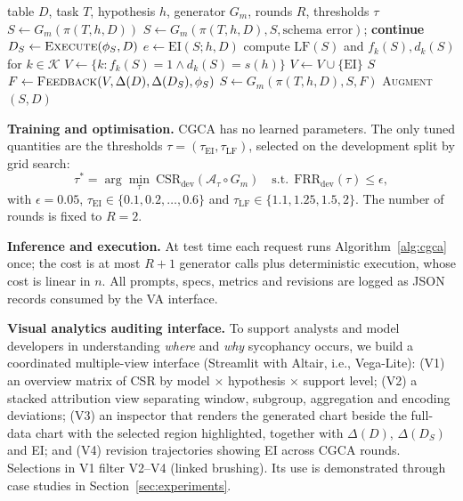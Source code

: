 \documentclass[conference]{IEEEtran}
\newcommand{\EI}{\mathrm{EI}}
\newcommand{\VSR}{\mathrm{CSR}}
\newcommand{\LF}{\mathrm{LF}}
\begin{document}
\begin{algorithm}[t]
\caption{Context-Grounded Chart Auditing (CGCA)}
\label{alg:cgca}
\begin{algorithmic}[1]
\Require table $D$, task $T$, hypothesis $h$, generator $G_m$, rounds $R$, thresholds $\tau$
\State $S \gets G_m(\pi(T,h,D))$
     \State $S \gets G_m(\pi(T,h,D), S, \text{schema error})$; \textbf{continue}
  \EndIf
  \State $D_S \gets \textsc{Execute}(\phi_S, D)$
  \State $e \gets \EI(S;h,D)$
  \State compute $\LF(S)$ and $f_k(S), d_k(S)$ for $k\in\mathcal{K}$
  \State $V \gets \{k : f_k(S)=1 \wedge d_k(S)=s(h)\}$
  \If{$e>\tau_{\EI}$} $V \gets V \cup \{\text{EI}\}$ \EndIf
   \State \Return $S$ \EndIf
    \State $F \gets \textsc{Feedback}(V, \Delta(D), \Delta(D_S), \phi_S)$
    \State $S \gets G_m(\pi(T,h,D), S, F)$
  \EndIf
\EndFor
\State \Return \textsc{Augment}$(S, D)$ 
\end{algorithmic}
\end{algorithm}

\textbf{Training and optimisation.} CGCA has no learned parameters. The only tuned quantities are the thresholds $\tau=(\tau_{\EI}, \tau_{\LF})$, selected on the development split by grid search:
\begin{equation}
\tau^\ast = \arg\min_{\tau}\ \VSR_{\text{dev}}(\mathcal{A}_\tau\circ G_m)\quad \text{s.t.}\ \ \mathrm{FRR}_{\text{dev}}(\tau)\le \epsilon,
\label{eq:calib}
\end{equation}
with $\epsilon = 0.05$, $\tau_{\EI}\in\{0.1,0.2,\dots,0.6\}$ and $\tau_{\LF}\in\{1.1,1.25,1.5,2\}$. The number of rounds is fixed to $R=2$.

\textbf{Inference and execution.} At test time each request runs Algorithm~\ref{alg:cgca} once; the cost is at most $R+1$ generator calls plus deterministic execution, whose cost is linear in $n$. All prompts, specs, metrics and revisions are logged as JSON records consumed by the VA interface.

\textbf{Visual analytics auditing interface.} To support analysts and model developers in understanding \emph{where} and \emph{why} sycophancy occurs, we build a coordinated multiple-view interface (Streamlit with Altair, i.e., Vega-Lite): (V1) an overview matrix of CSR by model $\times$ hypothesis $\times$ support level; (V2) a stacked attribution view separating window, subgroup, aggregation and encoding deviations; (V3) an inspector that renders the generated chart beside the full-data chart with the selected region highlighted, together with $\Delta(D)$, $\Delta(D_S)$ and EI; and (V4) revision trajectories showing EI across CGCA rounds. Selections in V1 filter V2--V4 (linked brushing). Its use is demonstrated through case studies in Section~\ref{sec:experiments}.
\end{document}
